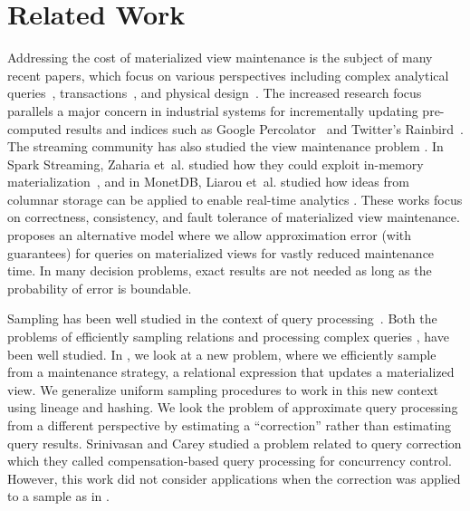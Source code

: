 \vspace{-1em}
\section{Related Work}\label{related}
\vspace{-.3em}

Addressing the cost of materialized view maintenance is the subject of many recent papers, which
focus on various perspectives including complex analytical queries~\cite{nikolic2014linview}, transactions~\cite{bailis2014scalable}, and physical design~\cite{lefevre2014opportunistic}.
The increased research focus parallels a major concern in industrial systems for incrementally updating pre-computed results and indices such as Google Percolator~\cite{percolator} and Twitter's Rainbird~\cite{rainbird}.
The streaming community has also studied the view maintenance problem \cite{abadi2003aurora,golab2011consistency, golab2012scalable, he2010comet, ghanem2010supporting, KrishnamurthyFDFGLT10}. In Spark Streaming, Zaharia et~al. studied how they could exploit in-memory materialization~\cite{zaharia2012discretized}, and in MonetDB, Liarou et~al. studied how ideas from columnar storage can be applied to enable real-time analytics \cite{liarou2012monetdb}.
These works focus on correctness, consistency, and fault tolerance of materialized view maintenance.
\svc proposes an alternative model where we allow approximation error (with guarantees) for queries on materialized views for vastly reduced maintenance time.
In many decision problems, exact results are not needed as long as the probability of error is boundable. 

Sampling has been well studied in the context of query processing~\cite{AgarwalMPMMS13, olken1993random, garofalakis2001approximate}. 
Both the problems of efficiently sampling relations \cite{olken1993random} and processing complex queries \cite{agarwalknowing}, have been well studied. 
In \svc, we look at a new problem, where we efficiently sample from a maintenance strategy, a relational expression that updates a materialized view.
We generalize uniform sampling procedures to work in this new context using lineage \cite{DBLP:journals/vldb/CuiW03} and hashing.
We look the problem of approximate query processing \cite{AgarwalMPMMS13, agarwalknowing} from a different perspective by estimating a ``correction'' rather than estimating query results. 
Srinivasan and Carey studied a problem related to query correction which they called compensation-based query processing \cite{srinivasanC92} for concurrency control.
However, this work did not consider applications when the correction was applied to a sample as in \svc.

